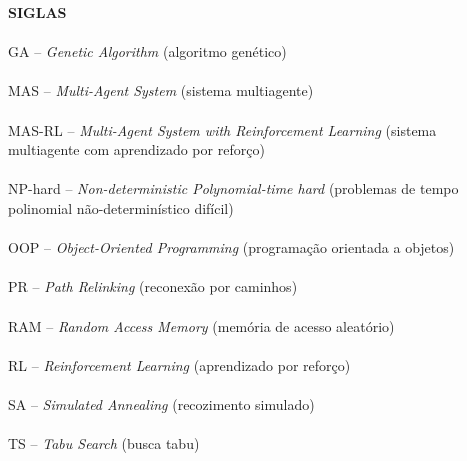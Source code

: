 \pagebreak


\begin{center}
\textbf{SIGLAS}
\end{center}
      \vspace{0.5cm}

\paragraph{}GA -- \textit{Genetic Algorithm} (algoritmo genético)
\paragraph{}MAS -- \textit{Multi-Agent System} (sistema multiagente)
\paragraph{}MAS-RL -- \textit{Multi-Agent System with Reinforcement Learning} (sistema multiagente com aprendizado por reforço)
\paragraph{}NP-hard -- \textit{Non-deterministic Polynomial-time hard} (problemas de tempo polinomial não-determinístico difícil)
\paragraph{}OOP -- \textit{Object-Oriented Programming} (programação orientada a objetos)
\paragraph{}PR -- \textit{Path Relinking} (reconexão por caminhos)
\paragraph{}RAM -- \textit{Random Access Memory} (memória de acesso aleatório)
\paragraph{}RL -- \textit{Reinforcement Learning} (aprendizado por reforço)
\paragraph{}SA -- \textit{Simulated Annealing} (recozimento simulado)
\paragraph{}TS -- \textit{Tabu Search} (busca tabu)
